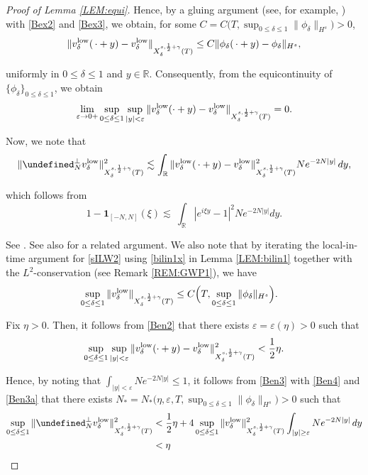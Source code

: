 \documentclass[letterpaper, 11pt,  reqno]{amsart}
\newcommand{\1}{\hspace{0.5mm}\textup{I}\hspace{0.5mm}}
\newcommand{\noi}{\noindent}
\newcommand{\R}{\mathbb{R}}
\let\P= \undefined
\newcommand{\P}{\mathbf{P}}
\newcommand{\low}{\textup{low}}
\newcommand{\dl}{\delta}
\newcommand{\eps}{\varepsilon}
\newcommand{\g}{\gamma}
\newcommand{\les}{\lesssim}
\newcommand{\ind}{\mathbf 1}
\numberwithin{equation}{section}
\numberwithin{theorem}{section}
\begin{document}
\begin{proof}[Proof of Lemma \ref{LEM:equi}]
\noi
Hence, 
by  a gluing argument (see, for example,  \cite[Lemma 4.5]{bring})
with \eqref{Bex2} and \eqref{Bex3}, 
we obtain, for some 
 \(C = C\bigl(T,\sup_{0\leq \dl\leq 1}\|\phi_\dl\|_{H^s}\bigr)>0\), 
\begin{align*}
\|v_\dl^\low(\, \cdot + y) - v_\dl^\low \|_{X^{s,\frac12+\gamma}_\dl(T)}\leq C\|\phi_\dl(\,\cdot+y) - \phi_\dl\|_{H^s}, 
\end{align*}



\noi
uniformly in $0 \le \dl  \le 1$ and 
 $y \in \R$.
Consequently, 
from the equicontinuity of $\{\phi_\dl\}_{0 \le \dl \le 1}$, we obtain
\begin{align}
\lim_{\eps\to0+}\sup_{0\leq \dl\leq 1}\sup_{|y|<\eps}
\|v_\dl^\low(\cdot + y) - v_\dl^\low\|_{X^{s,\frac12+\gamma}_\dl(T)} = 0.
\label{Ben2}
\end{align}





Now, we note that 
\begin{align}
 \| \P_{N}^\perp v_\dl^\low\|_{X_\dl^{s, \frac 12 + \g}(T)}^2
 \lesssim \int_\R \|v_\dl^\low(\,\cdot+y) - v_\dl^\low\|_{X_\dl^{s,\frac12+\g}(T)}^2 Ne^{-2N|y|}\,dy, 
\label{Ben3}
\end{align}

\noi
which follows from 
\[ 1 - \ind_{[-N, N]}(\xi) \les \
\int_\R  |e^{i \xi y} - 1|^2Ne^{-2N|y|}dy.\]

\noi
See
\cite[the proof of Lemma 4.2]{KV19}.
See also 
\cite[Theorem 4]{Pego}
for a related argument.
We also note that by iterating the local-in-time argument  for \eqref{sILW2}
using \eqref{bilin1x} in Lemma \ref{LEM:bilin1}
together with the $L^2$-conservation (see Remark \ref{REM:GWP1}), 
we have 
\begin{align}
 \sup_{0 \leq  \dl \le 1}
 \|v_\dl^\low\|_{X_\dl^{s,\frac12+\g}(T)}
& \le C\Big(T, 
 \sup_{0\leq \dl\leq 1}\|\phi_\dl\|_{H^s}\Big).
 \label{Ben3a}
\end{align}



Fix  $\eta > 0$.
Then, it follows from \eqref{Ben2} that 
there exists
 $\eps = \eps(\eta) > 0$ such that 
\begin{align}
\sup_{0\leq \dl\leq 1}\sup_{|y|<\eps}
\|v_\dl^\low(\cdot + y) - v_\dl^\low\|_{X^{s,\frac12+\gamma}_\dl(T)}^2 < \frac 12 \eta.
\label{Ben4}
\end{align}

\noi
Hence, by noting that $\int_{|y|< \eps} N e^{-2N|y|} \le 1$, 
it follows from \eqref{Ben3} with \eqref{Ben4} and \eqref{Ben3a} that 
there exists
 $N_* = N_*\big(\eta, \eps,  T, \sup_{0\leq \dl\leq 1}\|\phi_\dl\|_{H^s}\big) > 0$ 
 such that 
\begin{align*}
 \sup_{0 \leq  \dl \le 1}
 \| \P_{N}^\perp v_\dl^\low\|_{X_\dl^{s, \frac 12 + \g}(T)} ^2
& < 
\frac 12 \eta
+ 
4
 \sup_{0 \leq  \dl \le 1}
 \|v_\dl^\low\|_{X_\dl^{s,\frac12+\g}(T)}^2
\int_{|y|\ge \eps} Ne^{-2N|y|}\,dy\\
& < \eta
\end{align*}


\end{proof}
\end{document}
